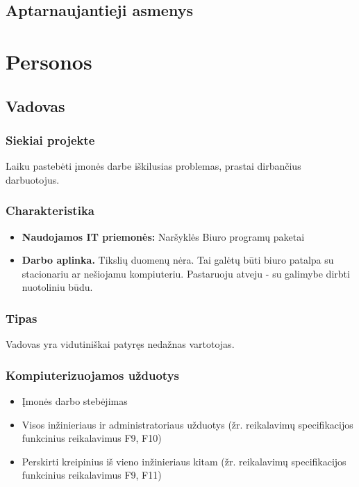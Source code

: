 	\subsection{Aptarnaujantieji asmenys}

\section{Personos}

	\subsection{Vadovas}
		
		\subsubsection{Siekiai projekte}
		
		Laiku pastebėti įmonės darbe iškilusias problemas, prastai dirbančius darbuotojus.
		
		\subsubsection{Charakteristika}
		
		\begin{itemize}
			\item \textbf{Naudojamos IT priemonės:}
				\subitem Naršyklės
				\subitem Biuro programų paketai
			\item \textbf{Darbo aplinka.} Tikslių duomenų nėra. 
			Tai galėtų būti biuro patalpa su stacionariu ar nešiojamu kompiuteriu.
			Pastaruoju atveju - su galimybe dirbti nuotoliniu būdu.
		\end{itemize}
			
		\subsubsection{Tipas}
		
		Vadovas yra vidutiniškai patyręs nedažnas vartotojas.
		
		\subsubsection{Kompiuterizuojamos užduotys}
		
		\begin{itemize}
			\item Įmonės darbo stebėjimas
			\item Visos inžinieriaus ir administratoriaus užduotys (žr. reikalavimų specifikacijos funkcinius reikalavimus F9, F10)
			\item Perskirti kreipinius iš vieno inžinieriaus kitam (žr. reikalavimų specifikacijos funkcinius reikalavimus F9, F11)
		\end{itemize}
		
